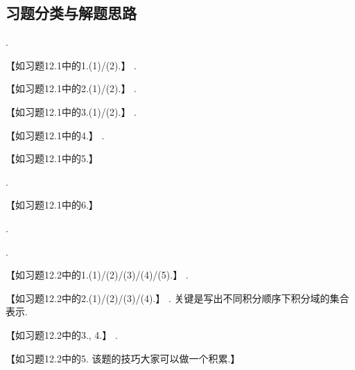 \documentclass[12pt,UTF8]{ctexart}
\begin{document}
\subsection{习题分类与解题思路}
\begin{enumerate}
\begin{enumerate}
.

【如习题12.1中的1.(1)/(2).】
.

【如习题12.1中的2.(1)/(2).】
.

【如习题12.1中的3.(1)/(2).】
.

【如习题12.1中的4.】
.

【如习题12.1中的5.】

.

【如习题12.1中的6.】
\end{enumerate}
.
\begin{enumerate}
.

【如习题12.2中的1.(1)/(2)/(3)/(4)/(5).】
.

【如习题12.2中的2.(1)/(2)/(3)/(4).】
. 关键是写出不同积分顺序下积分域的集合表示.

【如习题12.2中的3., 4.】
.

【如习题12.2中的5. 该题的技巧大家可以做一个积累.】
\end{enumerate}
\end{enumerate}
\end{document}

